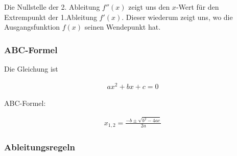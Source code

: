 \documentclass[a4paper]{article}
\begin{document}
Die Nullstelle der 2. Ableitung $f''(x)$ zeigt uns den $x$-Wert für den Extrempunkt der 1.Ableitung $f'(x)$. Dieser wiederum zeigt uns, wo die Ausgangsfunktion $f(x)$ seinen Wendepunkt hat.


\subsubsection*{ABC-Formel}

Die Gleichung ist

\begin{align*}
	ax^2 + bx + c = 0
\end{align*}

ABC-Formel:

\begin{align*}
	x_{1,2} = \frac{-b \pm \sqrt{b^2 - 4ac}}{2a}
\end{align*}

\subsubsection*{Ableitungsregeln}
\end{document}
